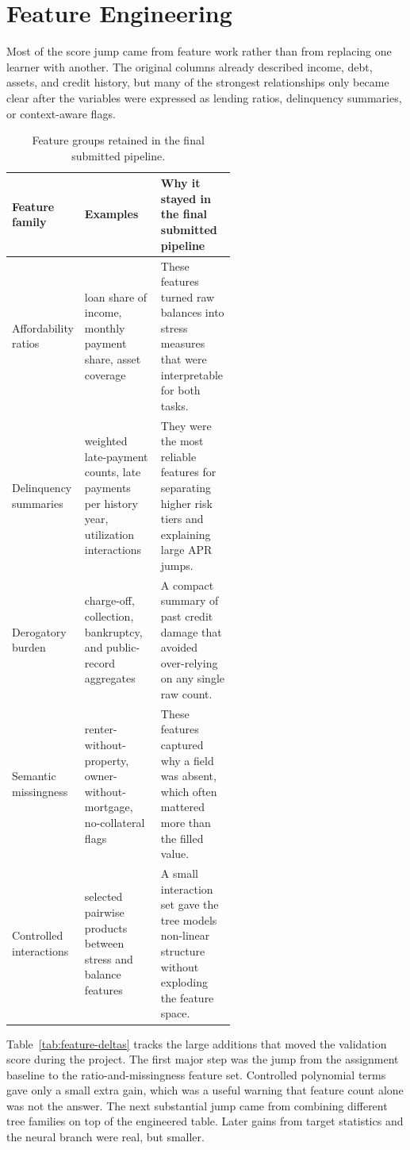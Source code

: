 \section{Feature Engineering}

Most of the score jump came from feature work rather than from replacing one learner with another. The original columns already described income, debt, assets, and credit history, but many of the strongest relationships only became clear after the variables were expressed as lending ratios, delinquency summaries, or context-aware flags.

\begin{table}[H]
    \centering
    \small
    \begin{tabularx}{\linewidth}{@{} p{0.22\linewidth} p{0.34\linewidth} X @{}}
        \toprule
        Feature family & Examples & Why it stayed in the final submitted pipeline \\
        \midrule
        Affordability ratios & loan share of income, monthly payment share, asset coverage & These features turned raw balances into stress measures that were interpretable for both tasks. \\
        Delinquency summaries & weighted late-payment counts, late payments per history year, utilization interactions & They were the most reliable features for separating higher risk tiers and explaining large APR jumps. \\
        Derogatory burden & charge-off, collection, bankruptcy, and public-record aggregates & A compact summary of past credit damage that avoided over-relying on any single raw count. \\
        Semantic missingness & renter-without-property, owner-without-mortgage, no-collateral flags & These features captured why a field was absent, which often mattered more than the filled value. \\
        Controlled interactions & selected pairwise products between stress and balance features & A small interaction set gave the tree models non-linear structure without exploding the feature space. \\
        \bottomrule
    \end{tabularx}
    \caption{Feature groups retained in the final submitted pipeline.}
    \label{tab:feature-families}
\end{table}

Table~\ref{tab:feature-deltas} tracks the large additions that moved the validation score during the project. The first major step was the jump from the assignment baseline to the ratio-and-missingness feature set. Controlled polynomial terms gave only a small extra gain, which was a useful warning that feature count alone was not the answer. The next substantial jump came from combining different tree families on top of the engineered table. Later gains from target statistics and the neural branch were real, but smaller.


